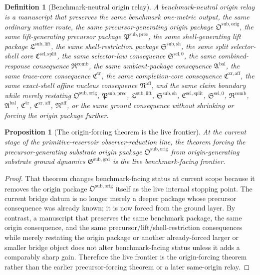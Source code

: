 \documentclass[11pt]{article}
\newcommand{\CompletionCore}{\mathfrak C^{\mathrm{zr,aff}}}
\newcommand{\TraceCore}{\mathfrak C^{\mathrm{tr}}}
\newcommand{\AffineNucleus}{\mathfrak N^{\mathrm{aff}}}
\newcommand{\AmbientPackage}{\mathfrak A^{\mathrm{bal}}}
\newcommand{\CombinedLaw}{\mathfrak R^{\mathrm{comb}}}
\newcommand{\SelectorLaw}{\mathfrak S^{\mathrm{sel},0}}
\newcommand{\SelectorCore}{\mathfrak C^{\mathrm{sel,split}}}
\newcommand{\ShellRestriction}{\mathfrak S^{\mathrm{sub,sh}}}
\newcommand{\LiftPackage}{\mathfrak L^{\mathrm{sub,lift}}}
\newcommand{\PrecursorPackage}{\mathfrak P^{\mathrm{sub,prec}}}
\newcommand{\OriginPackage}{\mathfrak O^{\mathrm{sub,orig}}}
\newcommand{\GroundPackage}{\mathfrak G^{\mathrm{sub,grd}}}
\newtheorem{definition}{Definition}
\newtheorem{proposition}{Proposition}
\begin{document}
\begin{definition}[Benchmark-neutral origin relay]
A \emph{benchmark-neutral origin relay} is a manuscript that preserves the same benchmark one-metric output, the same ordinary matter route, the same precursor-generating origin package \(\OriginPackage\), the same lift-generating precursor package \(\PrecursorPackage\), the same shell-generating lift package \(\LiftPackage\), the same shell-restriction package \(\ShellRestriction\), the same split selector-shell core \(\SelectorCore\), the same selector-law consequence \(\SelectorLaw\), the same combined-response consequence \(\CombinedLaw\), the same ambient-package consequence \(\AmbientPackage\), the same trace-core consequence \(\TraceCore\), the same completion-core consequence \(\CompletionCore\), the same exact-shell affine nucleus consequence \(\AffineNucleus\), and the same claim boundary while merely restating \(\OriginPackage\), \(\PrecursorPackage\), \(\LiftPackage\), \(\ShellRestriction\), \(\SelectorCore\), \(\SelectorLaw\), \(\CombinedLaw\), \(\AmbientPackage\), \(\TraceCore\), \(\CompletionCore\), \(\AffineNucleus\), or the same ground consequence without shrinking or forcing the origin package further.
\end{definition}

\begin{proposition}[The origin-forcing theorem is the live frontier]
At the current stage of the primitive-reservoir observer-reduction line, the theorem forcing the precursor-generating substrate origin package \(\OriginPackage\) from origin-generating substrate ground dynamics \(\GroundPackage\) is the live benchmark-facing frontier.
\end{proposition}

\begin{proof}
That theorem changes benchmark-facing status at current scope because it removes the origin package \(\OriginPackage\) itself as the live internal stopping point. The current bridge datum is no longer merely a deeper package whose precursor consequence was already known; it is now forced from the ground layer. By contrast, a manuscript that preserves the same benchmark package, the same origin consequence, and the same precursor/lift/shell-restriction consequences while merely restating the origin package or another already-forced larger or smaller bridge object does not alter benchmark-facing status unless it adds a comparably sharp gain. Therefore the live frontier is the origin-forcing theorem rather than the earlier precursor-forcing theorem or a later same-origin relay.
\end{proof}
\end{document}
